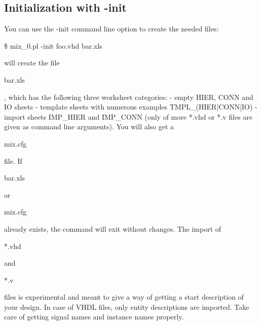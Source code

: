 \documentclass[a4paper,12pt]{article}
\begin{document}
\subsection{Initialization with -init}
You can use the -init command line option to create the needed files:\newline
\hspace*{20mm}\begin{tt}\$ mix\_0.pl -init foo.vhd bar.xls\end{tt}\newline
will create the file \begin{tt}bar.xls\end{tt}, which has the following three worksheet categories:\newline
\hspace*{10mm}- empty HIER, CONN and IO sheets\newline
\hspace*{10mm}- template sheets with numerous examples TMPL\_(HIER|CONN|IO)\newline
\hspace*{10mm}- import sheets IMP\_HIER and IMP\_CONN (only of more *.vhd or
\newline\hspace*{11mm} *.v files are given as command line arguments).\newline
You will also get a \begin{tt}mix.cfg\end{tt} file. If \begin{tt}bar.xls\end{tt} or \begin{tt}mix.cfg\end{tt} already exists, the command will exit without changes. The import of \begin{tt}*.vhd\end{tt} and \begin{tt}*.v\end{tt} files is experimental and meant to give a way of getting a start description of your design. In case of VHDL files, only entity descriptions are imported. Take care of getting signal names and instance names properly.
\end{document}

